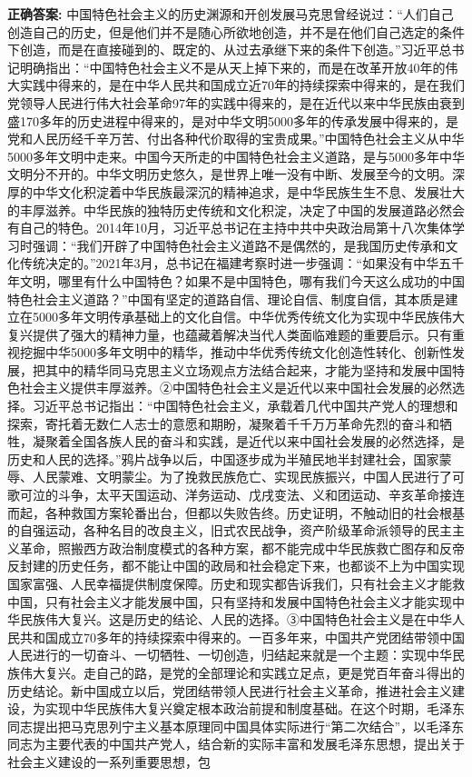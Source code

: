 \documentclass[12pt,UTF8]{ctexart}
\begin{document}
\textbf{正确答案:}
中国特色社会主义的历史渊源和开创发展马克思曾经说过：“人们自己创造自己的历史，但是他们并不是随心所欲地创造，并不是在他们自己选定的条件下创造，而是在直接碰到的、既定的、从过去承继下来的条件下创造。”习近平总书记明确指出：“中国特色社会主义不是从天上掉下来的，而是在改革开放40年的伟大实践中得来的，是在中华人民共和国成立近70年的持续探索中得来的，是在我们党领导人民进行伟大社会革命97年的实践中得来的，是在近代以来中华民族由衰到盛170多年的历史进程中得来的，是对中华文明5000多年的传承发展中得来的，是党和人民历经千辛万苦、付出各种代价取得的宝贵成果。”中国特色社会主义从中华5000多年文明中走来。中国今天所走的中国特色社会主义道路，是与5000多年中华文明分不开的。中华文明历史悠久，是世界上唯一没有中断、发展至今的文明。深厚的中华文化积淀着中华民族最深沉的精神追求，是中华民族生生不息、发展壮大的丰厚滋养。中华民族的独特历史传统和文化积淀，决定了中国的发展道路必然会有自己的特色。2014年10月，习近平总书记在主持中共中央政治局第十八次集体学习时强调：“我们开辟了中国特色社会主义道路不是偶然的，是我国历史传承和文化传统决定的。”2021年3月，总书记在福建考察时进一步强调：“如果没有中华五千年文明，哪里有什么中国特色？如果不是中国特色，哪有我们今天这么成功的中国特色社会主义道路？”中国有坚定的道路自信、理论自信、制度自信，其本质是建立在5000多年文明传承基础上的文化自信。中华优秀传统文化为实现中华民族伟大复兴提供了强大的精神力量，也蕴藏着解决当代人类面临难题的重要启示。只有重视挖掘中华5000多年文明中的精华，推动中华优秀传统文化创造性转化、创新性发展，把其中的精华同马克思主义立场观点方法结合起来，才能为坚持和发展中国特色社会主义提供丰厚滋养。②中国特色社会主义是近代以来中国社会发展的必然选择。习近平总书记指出：“中国特色社会主义，承载着几代中国共产党人的理想和探索，寄托着无数仁人志士的意愿和期盼，凝聚着千千万万革命先烈的奋斗和牺牲，凝聚着全国各族人民的奋斗和实践，是近代以来中国社会发展的必然选择，是历史和人民的选择。”鸦片战争以后，中国逐步成为半殖民地半封建社会，国家蒙辱、人民蒙难、文明蒙尘。为了挽救民族危亡、实现民族振兴，中国人民进行了可歌可泣的斗争，太平天国运动、洋务运动、戊戌变法、义和团运动、辛亥革命接连而起，各种救国方案轮番出台，但都以失败告终。历史证明，不触动旧的社会根基的自强运动，各种名目的改良主义，旧式农民战争，资产阶级革命派领导的民主主义革命，照搬西方政治制度模式的各种方案，都不能完成中华民族救亡图存和反帝反封建的历史任务，都不能让中国的政局和社会稳定下来，也都谈不上为中国实现国家富强、人民幸福提供制度保障。历史和现实都告诉我们，只有社会主义才能救中国，只有社会主义才能发展中国，只有坚持和发展中国特色社会主义才能实现中华民族伟大复兴。这是历史的结论、人民的选择。③中国特色社会主义是在中华人民共和国成立70多年的持续探索中得来的。一百多年来，中国共产党团结带领中国人民进行的一切奋斗、一切牺牲、一切创造，归结起来就是一个主题：实现中华民族伟大复兴。走自己的路，是党的全部理论和实践立足点，更是党百年奋斗得出的历史结论。新中国成立以后，党团结带领人民进行社会主义革命，推进社会主义建设，为实现中华民族伟大复兴奠定根本政治前提和制度基础。在这个时期，毛泽东同志提出把马克思列宁主义基本原理同中国具体实际进行“第二次结合”，以毛泽东同志为主要代表的中国共产党人，结合新的实际丰富和发展毛泽东思想，提出关于社会主义建设的一系列重要思想，包
\end{document}
